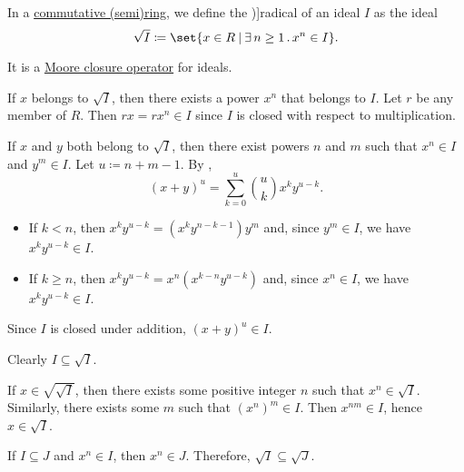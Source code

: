 \begin{definition}\label{def:radical_of_ideal}
  In a \hyperref[def:ring/commutative]{commutative (semi)ring}, we define the \term[bg=радикал (\cite[15]{КоцевСидеров2016})]{radical} of an ideal \( I \) as the ideal
  \begin{equation}\label{eq:def:radical_ideal}
    \sqrt I \coloneqq \set{ x \in R \given \qexists {n \geq 1} x^n \in I }.
  \end{equation}

  It is a \hyperref[def:moore_closure_operator]{Moore closure operator} for ideals.
\end{definition}
\begin{defproof}

   If \( x \) belongs to \( \sqrt I \), then there exists a power \( x^n \) that belongs to \( I \). Let \( r \) be any member of \( R \). Then \( rx = rx^n \in I \) since \( I \) is closed with respect to multiplication.

   If \( x \) and \( y \) both belong to \( \sqrt I \), then there exist powers \( n \) and \( m \) such that \( x^n \in I \) and \( y^m \in I \). Let \( u \coloneqq n + m - 1 \). By ,
  \begin{equation*}
    (x + y)^u = \sum_{k=0}^u \binom u k x^k y^{u-k}.
  \end{equation*}

  \begin{itemize}
    \item If \( k < n \), then \( x^k y^{u-k} = (x^k y^{n - k - 1}) y^m \) and, since \( y^m \in I \), we have \( x^k y^{u-k} \in I \).
    \item If \( k \geq n \), then \( x^k y^{u-k} = x^n (x^{k-n} y^{u-k}) \) and, since \( x^n \in I \), we have \( x^k y^{u-k} \in I \).
  \end{itemize}

  Since \( I \) is closed under addition, \( (x + y)^u \in I \).


   Clearly \( I \subseteq \sqrt I \).

   If \( x \in \sqrt {\sqrt I} \), then there exists some positive integer \( n \) such that \( x^n \in \sqrt I \). Similarly, there exists some \( m \) such that \( (x^n)^m \in I \). Then \( x^{nm} \in I \), hence \( x \in \sqrt I \).

   If \( I \subseteq J \) and \( x^n \in I \), then \( x^n \in J \). Therefore, \( \sqrt I \subseteq \sqrt J \).
\end{defproof}


